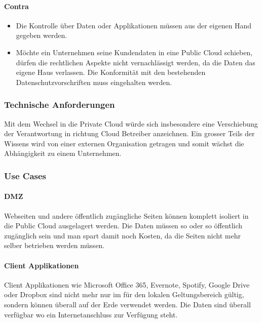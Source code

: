 \paragraph{Contra}
\begin{itemize}
	\item Die Kontrolle über Daten oder Applikationen müssen aus der eigenen Hand gegeben werden. 
	\item Möchte ein Unternehmen seine Kundendaten in eine Public Cloud schieben, dürfen die rechtlichen Aspekte nicht vernachlässigt werden, da die Daten das eigene Haus verlassen. Die Konformität mit den bestehenden Datenschutzvorschriften muss eingehalten werden.
\end{itemize}

\subsubsection{Technische Anforderungen}
Mit dem Wechsel in die Private Cloud würde sich insbesondere eine Verschiebung der Verantwortung in richtung Cloud Betreiber anzeichnen. Ein grosser Teils der Wissens wird von einer externen Organisation getragen und somit wächst die Abhängigkeit zu einem Unternehmen.

\subsubsection{Use Cases}
\paragraph{DMZ} Webseiten und andere öffentlich zugängliche Seiten können komplett isoliert in die Public Cloud ausgelagert werden. Die Daten müssen so oder so öffentlich zugänglich sein und man spart damit noch Kosten, da die Seiten nicht mehr selber betrieben werden müssen.

\paragraph{Client Applikationen}
Client Applikationen wie Microsoft Office 365, Evernote, Spotify, Google Drive oder Dropbox sind nicht mehr nur im für den lokalen Geltungsbereich gültig, sondern können überall auf der Erde verwendet werden. Die Daten sind überall verfügbar wo ein Internetanschluss zur Verfügung steht.

